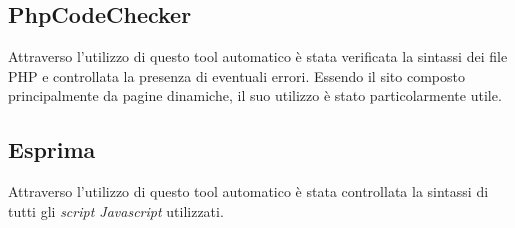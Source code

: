 \subsection{PhpCodeChecker}
Attraverso l’utilizzo di questo tool automatico è stata verificata la sintassi dei file PHP e controllata la presenza di eventuali errori. Essendo il sito composto principalmente da pagine dinamiche, il suo utilizzo è stato particolarmente utile.

\subsection{Esprima}
Attraverso l’utilizzo di questo tool automatico è stata controllata la sintassi di tutti gli \textit{script Javascript} utilizzati.